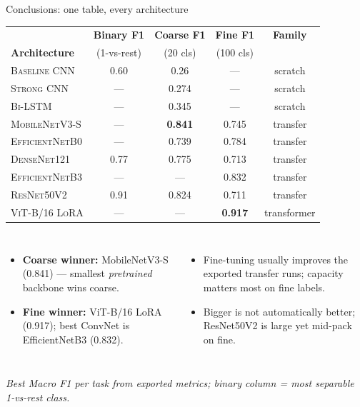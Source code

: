 \documentclass[aspectratio=169,11pt]{beamer}
\newcommand{\best}[1]{\textcolor{piraeusaccent}{\textbf{#1}}} %
\newcommand{\arch}[1]{\textsc{#1}}
\newcommand{\source}[1]{{\footnotesize\itshape\textcolor{softgrey}{#1}}}
\begin{document}
\begin{frame}{Conclusions: one table, every architecture}
  \centering
  \footnotesize
  \renewcommand{\arraystretch}{0.9}
  \setlength{\tabcolsep}{4pt}
  \begin{tabular}{@{}lcccc@{}}
    \toprule
     & \textbf{Binary F1} & \textbf{Coarse F1} & \textbf{Fine F1} & \textbf{Family} \\
    \textbf{Architecture} & {\footnotesize(1-vs-rest)} & {\footnotesize(20 cls)} & {\footnotesize(100 cls)} & {} \\
    \midrule
    \arch{Baseline CNN}    & 0.60 & 0.26          & ---           & scratch  \\
    \arch{Strong CNN}      & ---  & 0.274         & ---           & scratch  \\
    \arch{Bi-LSTM}         & ---  & 0.345         & ---           & scratch  \\
    \arch{MobileNetV3-S}   & ---  & \best{0.841}  & 0.745         & transfer  \\
    \arch{EfficientNetB0}  & ---  & 0.739         & 0.784         & transfer  \\
    \arch{DenseNet121}     & 0.77 & 0.775         & 0.713         & transfer  \\
    \arch{EfficientNetB3}  & ---  & ---           & 0.832         & transfer \\
    \arch{ResNet50V2}      & 0.91 & 0.824         & 0.711         & transfer \\
    \arch{ViT-B/16 LoRA}   & ---  & ---           & \best{0.917}  & transformer \\
    \bottomrule
  \end{tabular}

  \vspace{0.15em}    %
  \begin{columns}[T,onlytextwidth]
      \begin{itemize}
        \item \textbf{Coarse winner:} MobileNetV3-S (0.841) --- smallest \emph{pretrained} backbone wins coarse.
        \item \textbf{Fine winner:} ViT-B/16 LoRA (0.917); best ConvNet is EfficientNetB3 (0.832).
      \end{itemize}
      \begin{itemize}
        \item Fine-tuning usually improves the exported transfer runs; capacity matters most on fine labels.
        \item Bigger is not automatically better; ResNet50V2 is large yet mid-pack on fine.
      \end{itemize}
  \end{columns}
  \vspace{0.05em}    %
  \source{Best Macro F1 per task from exported metrics; binary column = most separable 1-vs-rest class.}
\end{frame}
\end{document}
